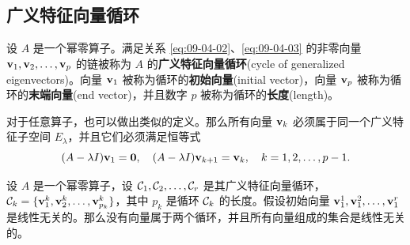 \subsection{广义特征向量循环}\label{sec:09-04-01}

\begin{definition*}
设 $A$ 是一个幂零算子。满足关系 \eqref{eq:09-04-02}、\eqref{eq:09-04-03} 的非零向量 $\mathbf{v}_1, \mathbf{v}_2, \dots, \mathbf{v}_p$ 的链被称为 $A$ 的\textbf{广义特征向量循环}(cycle of generalized eigenvectors)。向量 $\mathbf{v}_1$ 被称为循环的\textbf{初始向量}(initial vector)，向量 $\mathbf{v}_p$ 被称为循环的\textbf{末端向量}(end vector)，并且数字 $p$ 被称为循环的\textbf{长度}(length)。
\end{definition*}

\begin{remark*}
对于任意算子，也可以做出类似的定义。那么所有向量 $\mathbf{v}_k$ 必须属于同一个广义特征子空间 $E_\lambda$，并且它们必须满足恒等式
$$(A - \lambda I)\mathbf{v}_1 = \mathbf{0}, \quad (A - \lambda I)\mathbf{v}_{k+1} = \mathbf{v}_k, \quad k = 1, 2, \dots, p-1.$$
\end{remark*}



\begin{theorem}\label{stmt:09-04-01}
设 $A$ 是一个幂零算子，设 $\mathcal{C}_1, \mathcal{C}_2, \dots, \mathcal{C}_r$ 是其广义特征向量循环，$\mathcal{C}_k = \{\mathbf{v}^{k}_{1}, \mathbf{v}^{k}_{2}, \dots, \mathbf{v}^{k}_{p_k}\}$，其中 $p_k$ 是循环 $\mathcal{C}_k$ 的长度。假设初始向量 $\mathbf{v}^{1}_{1}, \mathbf{v}^{2}_{1}, \dots, \mathbf{v}^{r}_{1}$ 是线性无关的。那么没有向量属于两个循环，并且所有向量组成的集合是线性无关的。\end{theorem}


